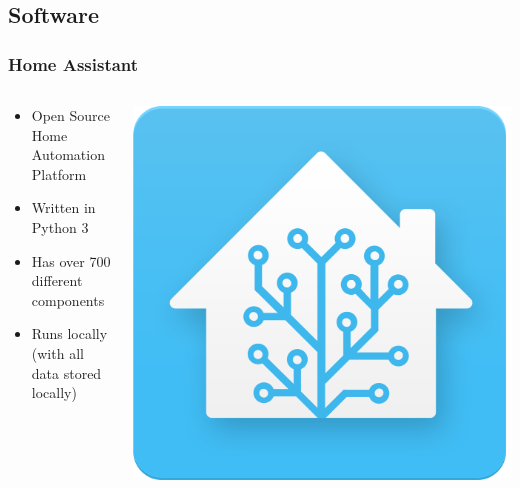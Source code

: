\documentclass[aspectratio=169,11pt,hyperref={colorlinks=true}]{beamer}
\begin{document}
\subsection{Software}
\begin{frame}
    \frametitle{Home Assistant}
    \begin{columns}
        \begin{column}{.48\textwidth}
            \begin{itemize}
                \item Open Source Home Automation Platform
                \item Written in Python 3
                \item Has over 700 different components
                \item Runs locally (with all data stored locally)
            \end{itemize}
        \end{column}
        \begin{column}{.48\textwidth}
            \includegraphics[width=\textwidth]{homeassistant.png}
        \end{column}
    \end{columns}
\end{frame}
\end{document}
